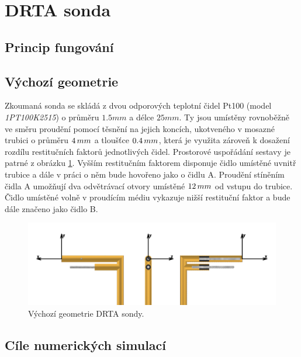 \section{DRTA sonda}
    \subsection{Princip fungování} \label{sec:DRTA-princip}
    \subsection{Výchozí geometrie}
        Zkoumaná sonda se skládá z dvou odporových teplotní čidel Pt100 (model \textit{1PT100K2515}) o průměru $1.5 \unit{mm}$ a délce $25 \unit{mm}$. Ty jsou umístěny rovnoběžně ve směru proudění pomocí těsnění na jejich koncích, ukotveného v mosazné trubici o průměru $4 \, mm$ a tloušťce $0.4 \, mm$, která je využita zároveň k dosažení rozdílu restitučních faktorů jednotlivých čidel. Prostorové uspořádání sestavy je patrné z obrázku \ref{fig:vychozi-DRTA}. Vyšším restitučním faktorem disponuje čidlo umístěné uvnitř trubice a dále v práci o něm bude hovořeno jako o čidlu A. Proudění stíněním čidla A umožňují dva odvětrávací otvory umístěné $12 \, mm$ od vstupu do trubice. Čidlo umístěné volně v proudícím médiu vykazuje nižší restituční faktor a bude dále značeno jako čidlo B.
        
        \begin{figure}[ht!]
            \centering
            \includegraphics[width=\textwidth]{200_DRTA_SONDA/Vychozi_DRTA.png}
            \caption{Výchozí geometrie DRTA sondy.}
            \label{fig:vychozi-DRTA}
        \end{figure}
    \subsection{Cíle numerických simulací}
        